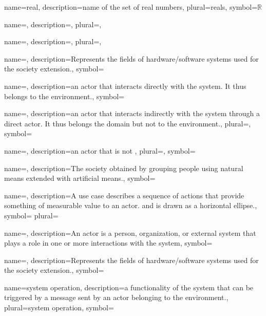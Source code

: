 
{name={real},
description={name of the set of real numbers},
plural={reals},
symbol={\ensuremath{\mathbb{R}}}
}

{name={},
description={},
plural={},
}

{name={},
description={},
plural={},
}

{name={},
description={Represents the fields of hardware/software
systems used for the society extension.},
symbol={}
}

{name={},
description={an actor that interacts directly with the system. It thus belongs to the environment.},
symbol={}
}

{name={},
description={an actor that interacts indirectly with the system through a direct actor. It thus belongs the domain but not to the environment.},
plural={},
symbol={}
}

{name={},
description={an actor that is not },
plural={},
symbol={}
}

{name={},
description={The society obtained by grouping people using natural means
extended with artificial means.},
symbol={} }

{name={},
description={A use case describes a sequence of actions that provide something
of measurable value to an actor. and is drawn as a horizontal ellipse.},
symbol={} plural={} }

{name={},
description={An actor is a person, organization, or external system that plays a role in one or more interactions with the system},
symbol={} }

{name={},
description={Represents the fields of hardware/software
systems used for the society extension.},
symbol={}
}

{name={system operation},
description={a functionality of the system that can be triggered by a message sent by an actor belonging to the environment.},
plural={system operation},
symbol={}
}




